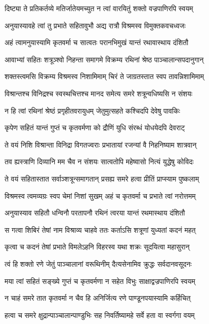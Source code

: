 \twolineshloka
{दिष्ट्या ते प्रतिकर्तव्ये मतिर्जातेयमच्युत}
{न त्वां वारयितुं शक्तो वज्रपाणिरपि स्वयम्}


\twolineshloka
{अनुयास्यावहे त्वां तु प्रभाते सहितावुभौ}
{अद्य रात्रौ विश्रमस्व विमुक्तकवचध्वजः}


\twolineshloka
{अहं त्वामनुयास्यामि कृतवर्मा च सात्वतः}
{परानभिमुखं यान्तं रथावास्थाय दंशितौ}


\twolineshloka
{आवाभ्यां सहितः शत्रूञ्श्वो निहन्ता समागमे}
{विक्रम्य रथिनां श्रेष्ठ पाञ्चालान्सपदानुगान्}


\twolineshloka
{शक्तस्त्वमसि विक्रम्य विश्रमस्व निशामिमाम्}
{चिरं ते जाग्रतस्तात स्वप तावन्निशामिमाम्}


\twolineshloka
{विश्रान्तश्च विनिद्रश्च स्वस्थचित्तश्च मानद}
{समेत्य समरे शत्रून्वधिष्यसि न संशयः}


\twolineshloka
{न हि त्वां रथिनां श्रेष्ठं प्रगृहीतवरायुधम्}
{जेतुमुत्सहते कश्चिदपि देवेषु पावकिः}


\twolineshloka
{कृपेण सहितं यान्तं गुप्तं च कृतवर्मणा}
{को द्रौणिं युधि संरब्धं योधयेदपि देवराट्}


\twolineshloka
{ते वयं निशि विश्रान्ता विनिद्रा विगतज्वराः}
{प्रभातायां रजन्यां वै निहनिष्याम शात्रवान्}


\twolineshloka
{तव ह्यस्त्राणि दिव्यानि मम चैव न संशयः}
{सात्वतोपि महेष्वासो नित्यं युद्धेषु कोविदः}


\twolineshloka
{ते वयं सहितास्तात सर्वाञ्शत्रून्समागतान्}
{प्रसह्य समरे हत्वा प्रीतिं प्राप्स्याम पुष्कलाम्}


\twolineshloka
{विश्रमस्व त्वमव्यग्रः स्वप चेमां निशां सुखम्}
{अहं च कृतवर्मा च प्रभाते त्वां नरोत्तमम्}


\twolineshloka
{अनुयास्याव सहितौ धन्विनौ परतापनौ}
{रथिनं त्वरया यान्तं रथमास्थाय दंशितौ}


\twolineshloka
{स गत्वा शिबिरं तेषां नाम विश्राव्य चाहवे}
{ततः कर्ताऽसि शत्रूणां युध्यतां कदनं महत्}


\twolineshloka
{कृत्वा च कदनं तेषां प्रभाते विमलेऽहनि}
{विहरस्व यथा शक्रः सूदयित्वा महासुरान्}


\twolineshloka
{त्वं हि शक्तो रणे जेतुं पाञ्चालानां वरूथिनीम्}
{दैत्यसेनामिव क्रुद्धः सर्वदानवसूदनः}


\twolineshloka
{मया त्वां सहितं सङ्ख्ये गुप्तं च कृतवर्मणा}
{न सहेत विभुः साक्षाद्वज्रपाणिरपि स्वयम्}


\twolineshloka
{न चाहं समरे तात कृतवर्मा न चैव हि}
{अनिर्जित्य रणे पाण्डूनपयास्यामि कर्हिचित्}


\twolineshloka
{हत्वा च समरे क्षुद्रान्पाञ्चालान्पाण्डुभिः सह}
{निवर्तिष्यामहे सर्वे हता वा स्वर्गगा वयम्}


